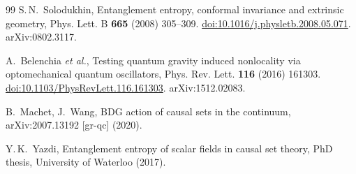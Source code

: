 \documentclass[12pt,a4paper]{article}
\theoremstyle{plain}
\theoremstyle{definition}
\theoremstyle{remark}
\begin{document}
\begin{thebibliography}{99}
S.\,N.~Solodukhin,
Entanglement entropy, conformal invariance and extrinsic geometry,
Phys. Lett. B \textbf{665} (2008) 305--309.
\href{https://doi.org/10.1016/j.physletb.2008.05.071}{doi:10.1016/j.physletb.2008.05.071}.
arXiv:0802.3117.

A.~Belenchia \textit{et al.},
Testing quantum gravity induced nonlocality via optomechanical quantum oscillators,
Phys. Rev. Lett. \textbf{116} (2016) 161303.
\href{https://doi.org/10.1103/PhysRevLett.116.161303}{doi:10.1103/PhysRevLett.116.161303}.
arXiv:1512.02083.

B.~Machet, J.~Wang,
BDG action of causal sets in the continuum,
arXiv:2007.13192 [gr-qc] (2020).

Y.\,K.~Yazdi,
Entanglement entropy of scalar fields in causal set theory,
PhD thesis, University of Waterloo (2017).

\end{thebibliography}
\end{document}
